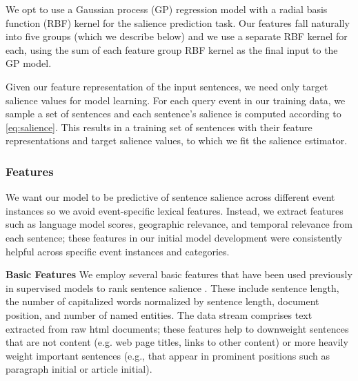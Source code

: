 
We opt to use a Gaussian process (GP) regression model \citep{rasmussen2005}
with a radial basis function (RBF) kernel for the salience prediction task.
Our features fall naturally into five groups (which we describe below) and we
use a separate RBF kernel for each, using the sum of each feature group RBF
kernel as the final input to the GP model.

Given our feature representation of the input sentences, we need only target
salience values for model learning. For each query event in our training data,
we sample a set of sentences and  each sentence's salience is computed
according to \autoref{eq:salience}. This results in a training set of
sentences with their feature representations and target salience values, to
which we fit the salience estimator.

\subsubsection{Features}
\label{sec:features}

We want our model to be predictive of sentence salience across different event
instances so we avoid event-specific lexical features.  Instead, we extract
features such as language model scores, geographic relevance, and temporal
relevance from each sentence; these features in our initial model development
were consistently helpful across specific event instances and categories.

\textbf{Basic Features}
We employ several basic features that have been used previously in supervised 
models to rank sentence salience \citep{kupiec1995trainable,conroy2001using}. 
These include sentence length, the number of capitalized words normalized by 
sentence length, document position, and number of named entities.  The data 
stream comprises text extracted from raw html documents; these features help 
to downweight sentences that are not content (e.g. web page titles, links to 
other content) or more heavily weight important sentences (e.g., that appear 
in prominent positions such as paragraph initial or article initial).

